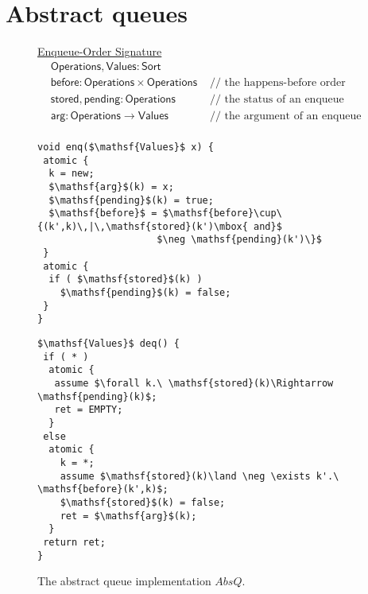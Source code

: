 \section{Abstract queues}


\begin{figure}[t]
{	\centering
	\underline{Enqueue-Order Signature}
	\begin{align*}
		& \mathsf{Operations}, \mathsf{Values} : \mathsf{Sort} \\
		& \mathsf{before} : \mathsf{Operations} \times \mathsf{Operations} &\mbox{ // the happens-before order between enqueues} \\
		& \mathsf{stored}, \mathsf{pending} : \mathsf{Operations} &\mbox{ // the status of an enqueue} \\
		& \mathsf{arg} : \mathsf{Operations} \rightarrow \mathsf{Values} &\mbox{ // the argument of an enqueue} \\
	\end{align*}
}

\begin{minipage}[t]{6cm}
\begin{lstlisting}
void enq($\mathsf{Values}$ x) {
 atomic {
  k = new;
  $\mathsf{arg}$(k) = x;
  $\mathsf{pending}$(k) = true;
  $\mathsf{before}$ = $\mathsf{before}\cup\{(k',k)\,|\,\mathsf{stored}(k')\mbox{ and}$
                     $\neg \mathsf{pending}(k')\}$  
 }
 atomic {
  if ( $\mathsf{stored}$(k) )
    $\mathsf{pending}$(k) = false;
 }
}
\end{lstlisting}
\end{minipage}
\begin{minipage}[t]{5cm}
\begin{lstlisting}
$\mathsf{Values}$ deq() {
 if ( * )
  atomic {
   assume $\forall k.\ \mathsf{stored}(k)\Rightarrow \mathsf{pending}(k)$;
   ret = EMPTY;
  }
 else 
  atomic {
    k = *;
    assume $\mathsf{stored}(k)\land \neg \exists k'.\ \mathsf{before}(k',k)$;
    $\mathsf{stored}$(k) = false;
    ret = $\mathsf{arg}$(k);
  }
 return ret;
}
\end{lstlisting}
\end{minipage}

	\caption{The abstract queue implementation $AbsQ$.}
	\label{fig:signatures}
\end{figure}
